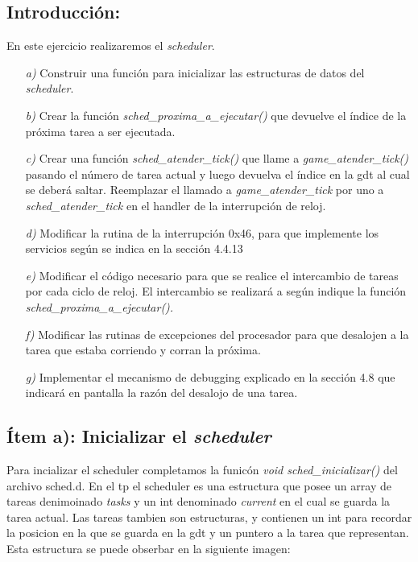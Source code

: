 \subsection{Introducción:}

En este ejercicio realizaremos el \textit{scheduler}.

\begin{itemize}

\item [\textit{a)}]  Construir una función para inicializar las estructuras de datos del \textit{scheduler}.

\item [\textit{b)}] Crear la función  \textit{sched\_proxima\_a\_ejecutar()} que devuelve el  índice de la próxima tarea a ser ejecutada. 

\item [\textit{c)}]  Crear una función \textit{sched\_atender\_tick()} que llame a \textit{game\_atender\_tick()} pasando el número de tarea actual y luego devuelva el índice en la gdt al cual se deberá saltar. Reemplazar el llamado a \textit{game\_atender\_tick} por uno a \textit{sched\_atender\_tick} en el handler de la interrupción de reloj.

\item [\textit{d)}] Modificar la rutina de la interrupción 0x46, para que implemente los servicios según se indica en la sección 4.4.13

\item [\textit{e)}]  Modificar el código necesario para que se realice el intercambio de tareas por cada ciclo de reloj. El intercambio se realizará a según indique la función \textit{sched\_proxima\_a\_ejecutar().}

\item [\textit{f)}]  Modificar las rutinas de excepciones del procesador para que desalojen a la tarea que estaba corriendo y corran la próxima.

\item [\textit{g)}] Implementar el mecanismo de debugging explicado en la sección 4.8 que indicará en pantalla la razón del desalojo de una tarea.

\end{itemize}

\subsection{Ítem a): Inicializar el \textit{scheduler}}

Para incializar el scheduler completamos la funicón \textit{void sched\_inicializar()} del archivo sched.d. En el tp el scheduler es una estructura que posee un array de tareas denimoinado \textit{tasks} y un int denominado \textit{current} en el cual se guarda la tarea actual. Las tareas tambien son estructuras, y contienen un int para recordar la posicion en la que se guarda en la gdt y un puntero a la tarea que representan. Esta estructura se puede obserbar en la siguiente imagen:

